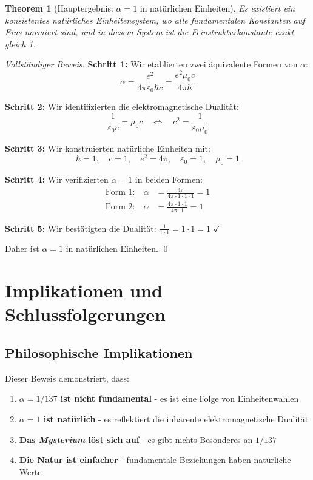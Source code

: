 \documentclass[12pt,a4paper]{article}
\newcommand{\alphaem}{\alpha}
\newtheorem{theorem}{Theorem}[section]
\begin{document}
	\begin{theorem}[Hauptergebnis: $\alpha = 1$ in natürlichen Einheiten]
		Es existiert ein konsistentes natürliches Einheitensystem, wo alle fundamentalen Konstanten auf Eins normiert sind, und in diesem System ist die Feinstrukturkonstante exakt gleich 1.
	\end{theorem}
	
	\begin{proof}[Vollständiger Beweis]
		\textbf{Schritt 1:} Wir etablierten zwei äquivalente Formen von $\alpha$:
		$$\alphaem = \frac{e^2}{4\pi\varepsilon_0\hbar c} = \frac{e^2 \mu_0 c}{4\pi \hbar}$$
		
		\textbf{Schritt 2:} Wir identifizierten die elektromagnetische Dualität:
		$$\frac{1}{\varepsilon_0 c} = \mu_0 c \quad \Leftrightarrow \quad c^2 = \frac{1}{\varepsilon_0\mu_0}$$
		
		\textbf{Schritt 3:} Wir konstruierten natürliche Einheiten mit:
		$$\hbar = 1, \quad c = 1, \quad e^2 = 4\pi, \quad \varepsilon_0 = 1, \quad \mu_0 = 1$$
		
		\textbf{Schritt 4:} Wir verifizierten $\alpha = 1$ in beiden Formen:
		\begin{align}
			\text{Form 1:} \quad \alphaem &= \frac{4\pi}{4\pi \cdot 1 \cdot 1 \cdot 1} = 1\\
			\text{Form 2:} \quad \alphaem &= \frac{4\pi \cdot 1 \cdot 1}{4\pi \cdot 1} = 1
		\end{align}
		
		\textbf{Schritt 5:} Wir bestätigten die Dualität: $\frac{1}{1 \cdot 1} = 1 \cdot 1 = 1$ $\checkmark$
		
		Daher ist $\alpha = 1$ in natürlichen Einheiten. \qed
	\end{proof}
	
	\section{Implikationen und Schlussfolgerungen}
	
	\subsection{Philosophische Implikationen}
	
	Dieser Beweis demonstriert, dass:
	
	\begin{enumerate}
		\item \textbf{$\alpha = 1/137$ ist nicht fundamental} - es ist eine Folge von Einheitenwahlen
		\item \textbf{$\alpha = 1$ ist natürlich} - es reflektiert die inhärente elektromagnetische Dualität
		\item \textbf{Das \textit{Mysterium} löst sich auf} - es gibt nichts Besonderes an $1/137$
		\item \textbf{Die Natur ist einfacher} - fundamentale Beziehungen haben natürliche Werte
	\end{enumerate}
	
\end{document}
